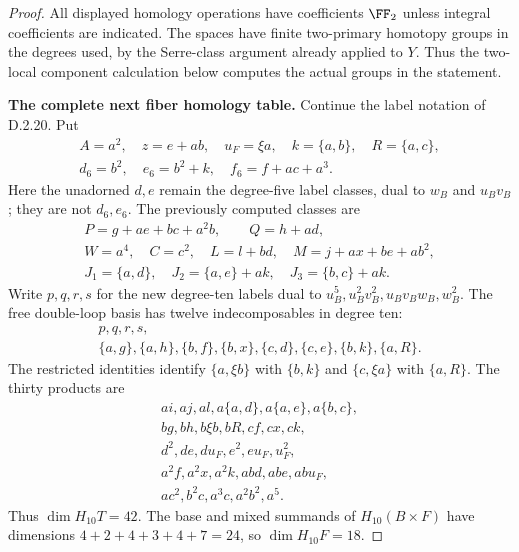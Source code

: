\begin{proof}
All displayed homology operations have coefficients $\FF_2$ unless
integral coefficients are indicated. The spaces have finite
two-primary homotopy groups in the degrees used, by the Serre-class
argument already applied to $Y$. Thus the two-local component
calculation below computes the actual groups in the statement.

\medskip\noindent
\textbf{The complete next fiber homology table.}
Continue the label notation of \textup{D.2.20}. Put
\[
 \begin{gathered}
 A=a^2,\quad z=e+ab,\quad u_F=\xi a,\quad
 k=\{a,b\},\quad R=\{a,c\},\\
 d_6=b^2,\quad e_6=b^2+k,\quad f_6=f+ac+a^3.
 \end{gathered}
 \tag{D.2.22a3}
\]
Here the unadorned $d,e$ remain the degree-five label classes,
dual to $w_B$ and $u_Bv_B$; they are not $d_6,e_6$.
The previously computed classes are
\[
\begin{gathered}
 P=g+ae+bc+a^2b,\qquad Q=h+ad,\\
 W=a^4,\quad C=c^2,\quad L=l+bd,\quad
 M=j+ax+be+ab^2,\\
 J_1=\{a,d\},\quad J_2=\{a,e\}+ak,\quad
 J_3=\{b,c\}+ak.
\end{gathered}
\]
Write $p,q,r,s$ for the new degree-ten labels dual to
$u_B^5,u_B^2v_B^2,u_Bv_Bw_B,w_B^2$.
The free double-loop basis has twelve indecomposables in degree ten:
\[
\begin{gathered}
 p,q,r,s,\\
 \{a,g\},\{a,h\},\{b,f\},\{b,x\},
 \{c,d\},\{c,e\},\{b,k\},\{a,R\}.
\end{gathered}
\]
The restricted identities identify $\{a,\xi b\}$ with $\{b,k\}$
and $\{c,\xi a\}$ with $\{a,R\}$.
The thirty products are
\[
\begin{gathered}
 ai,aj,al,a\{a,d\},a\{a,e\},a\{b,c\},\\
 bg,bh,b\xi b,bR,cf,cx,ck,\\
 d^2,de,du_F,e^2,eu_F,u_F^2,\\
 a^2f,a^2x,a^2k,abd,abe,abu_F,\\
 ac^2,b^2c,a^3c,a^2b^2,a^5.
\end{gathered}
\]
Thus $\dim H_{10}T=42$. The base and mixed summands of
$H_{10}(B\times F)$ have dimensions $4+2+4+3+4+7=24$,
so $\dim H_{10}F=18$.


\end{proof}
